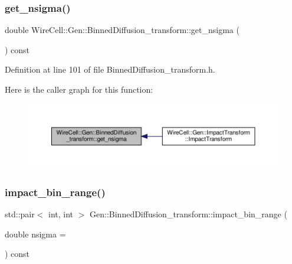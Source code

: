 \subsubsection{\texorpdfstring{get\+\_\+nsigma()}{get\_nsigma()}}
{\footnotesize\ttfamily double Wire\+Cell\+::\+Gen\+::\+Binned\+Diffusion\+\_\+transform\+::get\+\_\+nsigma (\begin{DoxyParamCaption}{ }\end{DoxyParamCaption}) const\hspace{0.3cm}{\ttfamily [inline]}}



Definition at line 101 of file Binned\+Diffusion\+\_\+transform.\+h.

Here is the caller graph for this function\+:
\nopagebreak
\begin{figure}[H]
\begin{center}
\leavevmode
\includegraphics[width=350pt]{class_wire_cell_1_1_gen_1_1_binned_diffusion__transform_a34dcb68c70dcf99ff252e36442f4bce8_icgraph}
\end{center}
\end{figure}
\mbox{\label{class_wire_cell_1_1_gen_1_1_binned_diffusion__transform_acc55b5ad48ce4bc6081155bc9b3847aa}} 
\subsubsection{\texorpdfstring{impact\+\_\+bin\+\_\+range()}{impact\_bin\_range()}}
{\footnotesize\ttfamily std\+::pair$<$ int, int $>$ Gen\+::\+Binned\+Diffusion\+\_\+transform\+::impact\+\_\+bin\+\_\+range (\begin{DoxyParamCaption}\item[{double}]{nsigma = {} }\end{DoxyParamCaption}) const}

